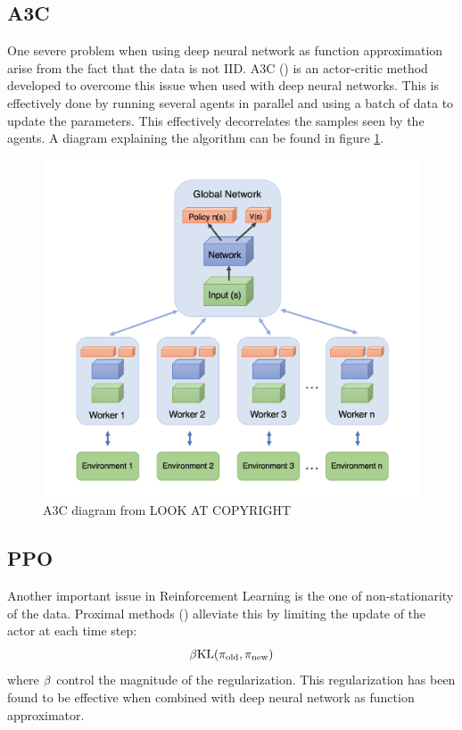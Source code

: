 \subsection{A3C}
One severe problem when using deep neural network as function approximation arise from the fact that the data is not IID. A3C (\cite{mnih2016asynchronous}) is an actor-critic method developed to overcome this issue when used with deep neural networks. This is effectively done by running several agents in parallel and using a batch of data to update the parameters. This effectively decorrelates the samples seen by the agents. A diagram explaining the algorithm can be found in figure \ref{fig:a3c}.
\begin{figure}
    \centering
    \includegraphics[scale=0.25]{fig/A3C.png}
    \caption{A3C diagram from LOOK AT COPYRIGHT }
    \label{fig:a3c}
\end{figure}
\subsection{PPO}
Another important issue in Reinforcement Learning is the one of non-stationarity of the data.
Proximal methods (\cite{schulman2017proximal,schulman2015trust}) alleviate this by limiting the update of the actor at each time step:
\begin{equation}
    \beta \text{KL}(\pi_{\text{old}},\pi_{\text{new}})
\end{equation}
where $\beta$ control the magnitude of the regularization. This regularization has been found to be effective when combined with deep neural network as function approximator.



